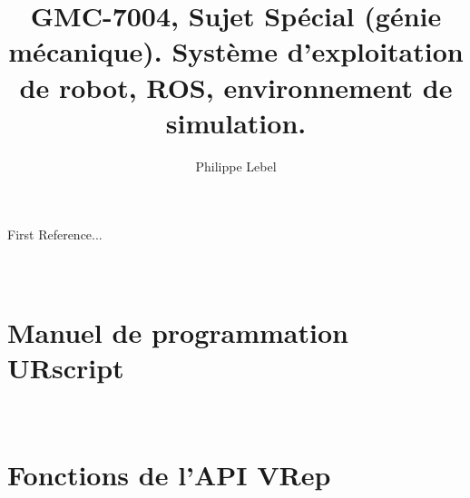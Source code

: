 \documentclass{articleUL}
\title{GMC-7004, Sujet Spécial (génie mécanique). Système d'exploitation de robot, ROS, environnement de simulation.}
\author{Philippe Lebel
 \affiliation{Université Laval, philippe.lebel.4@ulaval.ca}}
\begin{document}
 \maketitle
 
 
 
 \begin{thebibliography}{}
  First Reference...
 \end{thebibliography}
 \newpage
 \appendix
\section{\\Manuel de programmation URscript} \label{app:URscript_manual}



\section{\\Fonctions de l'API VRep} \label{app:VRep_manual}


 
\end{document}
